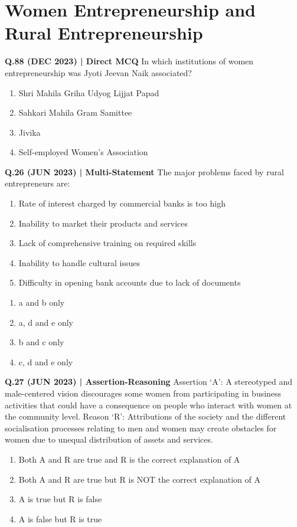 \documentclass{article}
\begin{document}
\section{Women Entrepreneurship and Rural Entrepreneurship}

\textbf{Q.88 (DEC 2023) | Direct MCQ}
In which institutions of women entrepreneurship was Jyoti Jeevan Naik associated?
\begin{enumerate}[label=(\arabic*)]
    \item Shri Mahila Griha Udyog Lijjat Papad
    \item Sahkari Mahila Gram Samittee
    \item Jivika
    \item Self-employed Women's Association
\end{enumerate}

\textbf{Q.26 (JUN 2023) | Multi-Statement}
The major problems faced by rural entrepreneurs are:
\begin{enumerate}[label=\alph*.]
    \item Rate of interest charged by commercial banks is too high
    \item Inability to market their products and services
    \item Lack of comprehensive training on required skills
    \item Inability to handle cultural issues
    \item Difficulty in opening bank accounts due to lack of documents
\end{enumerate}
\begin{enumerate}[label=(\arabic*)]
    \item a and b only
    \item a, d and e only
    \item b and c only
    \item c, d and e only
\end{enumerate}

\textbf{Q.27 (JUN 2023) | Assertion-Reasoning}
Assertion ‘A’: A stereotyped and male-centered vision discourages some women from participating in business activities that could have a consequence on people who interact with women at the community level.
Reason ‘R’: Attributions of the society and the different socialisation processes relating to men and women may create obstacles for women due to unequal distribution of assets and services.
\begin{enumerate}[label=(\arabic*)]
    \item Both A and R are true and R is the correct explanation of A
    \item Both A and R are true but R is NOT the correct explanation of A
    \item A is true but R is false
    \item A is false but R is true
\end{enumerate}
\end{document}
